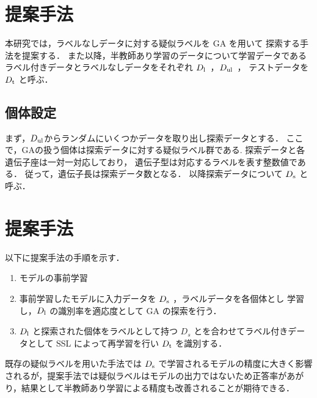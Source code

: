 
\newpage
\changeindent{0cm}
\section{提案手法}
\changeindent{2cm}
本研究では，ラベルなしデータに対する疑似ラベルを GA を用いて
探索する手法を提案する．
また以降，半教師あり学習のデータについて学習データである
ラベル付きデータとラベルなしデータをそれぞれ $D_{\rm l}$\ ，$D_{\rm ul}$\ ，
テストデータを $D_{\rm t}$ と呼ぶ．


\changeindent{0cm}
\subsection{個体設定}
\changeindent{2cm}
まず，$D_{\rm ul}$からランダムにいくつかデータを取り出し探索データとする．
ここで，GAの扱う個体は探索データに対する疑似ラベル群である.
探索データと各遺伝子座は一対一対応しており，
遺伝子型は対応するラベルを表す整数値である．
従って，遺伝子長は探索データ数となる．
以降探索データについて $D_{\rm s}$ と呼ぶ．

\changeindent{0cm}
\section{提案手法}
\changeindent{2cm}
以下に提案手法の手順を示す．

\begin{enumerate}
	\item モデルの事前学習
	\item 事前学習したモデルに入力データを $D_{\rm s}$ ，ラベルデータを各個体とし
	学習し，$D_{\rm l}$ の識別率を適応度として GA の探索を行う．
	\item $D_{\rm l}$ と探索された個体をラベルとして持つ $D_{s}$ とを合わせてラベル付きデータとして
	 SSL によって再学習を行い $D_{\rm t}$ を識別する．
\end{enumerate}

既存の疑似ラベルを用いた手法では $D_{\rm s}$ で学習されるモデルの精度に大きく影響されるが，提案手法では疑似ラベルはモデルの出力ではないため正答率があがり，結果として半教師あり学習による精度も改善されることが期待できる．

